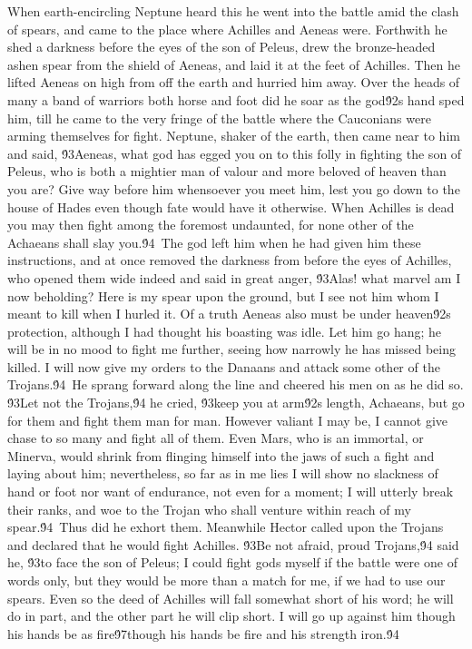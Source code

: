 {When earth-encircling Neptune heard this he went into the battle amid the clash of spears, and came to the place where Achilles and Aeneas were. Forthwith he shed a darkness before the eyes of the son of Peleus, drew the bronze-headed ashen spear from the shield of Aeneas, and laid it at the feet of Achilles. Then he lifted Aeneas on high from off the earth and hurried him away. Over the heads of many a band of warriors both horse and foot did he soar as the god\'92s hand sped him, till he came to the very fringe of the battle where the Cauconians were arming themselves for fight. Neptune, shaker of the earth, then came near to him and said, \'93Aeneas, what god has egged you on to this folly in fighting the son of Peleus, who is both a mightier man of valour and more beloved of heaven than you are? Give way before him whensoever you meet him, lest you go down to the house of Hades even though fate would have it otherwise. When Achilles is dead you may then fight among the foremost undaunted, for none other of the Achaeans shall slay you.\'94\
The god left him when he had given him these instructions, and at once removed the darkness from before the eyes of Achilles, who opened them wide indeed and said in great anger, \'93Alas! what marvel am I now beholding? Here is my spear upon the ground, but I see not him whom I meant to kill when I hurled it. Of a truth Aeneas also must be under heaven\'92s protection, although I had thought his boasting was idle. Let him go hang; he will be in no mood to fight me further, seeing how narrowly he has missed being killed. I will now give my orders to the Danaans and attack some other of the Trojans.\'94\
He sprang forward along the line and cheered his men on as he did so. \'93Let not the Trojans,\'94 he cried, \'93keep you at arm\'92s length, Achaeans, but go for them and fight them man for man. However valiant I may be, I cannot give chase to so many and fight all of them. Even Mars, who is an immortal, or Minerva, would shrink from flinging himself into the jaws of such a fight and laying about him; nevertheless, so far as in me lies I will show no slackness of hand or foot nor want of endurance, not even for a moment; I will utterly break their ranks, and woe to the Trojan who shall venture within reach of my spear.\'94\
Thus did he exhort them. Meanwhile Hector called upon the Trojans and declared that he would fight Achilles. \'93Be not afraid, proud Trojans,\'94 said he, \'93to face the son of Peleus; I could fight gods myself if the battle were one of words only, but they would be more than a match for me, if we had to use our spears. Even so the deed of Achilles will fall somewhat short of his word; he will do in part, and the other part he will clip short. I will go up against him though his hands be as fire\'97though his hands be fire and his strength iron.\'94\
}
